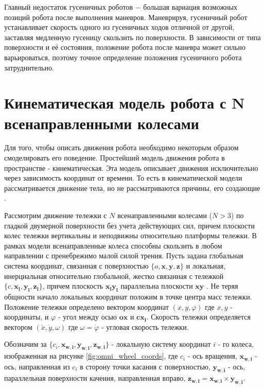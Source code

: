 \documentclass[oneside,final,14pt]{extreport}
\newcommand{\bs}{\boldsymbol}
\begin{document}
Главный недостаток гусеничных роботов $-$ большая вариация возможных позиций робота после выполнения маневров. Маневрируя, гусеничный робот устанавливает скорость одного из гусеничных ходов отличной от другой, заставляя медленную гусеницу скользить по поверхности. В зависимости от типа поверхности и её состояния, положение робота после маневра может сильно варьироваться, поэтому точное определение положения гусеничного робота затруднительно. 

\chapter{Кинематическая модель робота с N всенаправленными колесами}   
Для того, чтобы описать движения робота необходимо некоторым образом смоделировать его поведение. Простейший модель движения робота в пространстве - кинематическая. Эта модель описывает движения исключительно через зависимость координат от времени. То есть в кинематической модели рассматривается движение тела, но не рассматриваются причины, его создающие \cite{Src:Saveliev}.

Рассмотрим движение тележки с $N$ всенаправленными колесами ($N > 3$) по гладкой двумерной поверхности без учета действующих сил, причем плоскости колес тележки вертикальны и неподвижны относительно платформы тележки. В рамках модели всенаправленные колеса способны скользить в любом направлении с пренебрежимо малой силой трения. Пусть задана глобальная система координат, связанная с поверхностью $\{o,\boldsymbol{x},\bs{y},\bs{z}\}$ и локальная,  инерциальная относительно глобальной, жестко связанная с тележкой $\{c,\bs{x_{l}},\bs{y_{l}},\bs{z_{l}}\}$, причем плоскость $\bs{x_{l}}\bs{y_{l}}$  параллельна плоскости $\bs{x}\bs{y}$ . Не теряя общности начало локальных координат положим в точке центра масс тележки. Положение тележки определено вектором координат $(x,y,\varphi)$
где $x,y$ - координаты, и $\varphi$ -  угол между осью $\bs{ox}$ и $\bs{cx_{l}}$. Скорость тележки определяется вектором $(\dot{x},\dot{y},\omega)$ где $\omega = \dot{\varphi}$ - угловая скорость тележки. 

Обозначим за $\{c_{i},\bs{x_{w,i}},\bs{y_{w,i}},\bs{z_{w,i}}\}$ - локальную систему координат $i$ - го колеса, изображенная на рисунке \ref{fig:omni_wheel_coords}, где $c_{i}$ - ось вращения, $\bs{x_{w,i}}$  - ось, направленная из $c_{i}$  в сторону точки касания с поверхностью, $\bs{y_{w,i}}$ - ось, параллельная поверхности качения, направленная вправо, $\bs{z_{w,i}} = \bs{x_{w,i}} \times \bs{y_{w,i}}$.  
\end{document}
